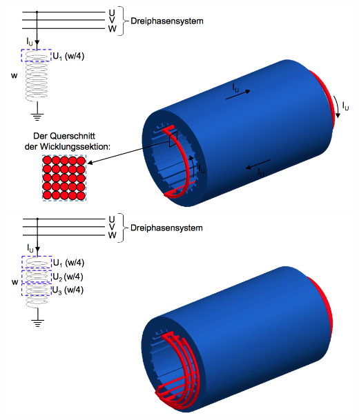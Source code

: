 \begin{minipage}{0.5 \linewidth}
\includegraphics[width = \linewidth]{./Pics/VL89/Drehfeld2}
\includegraphics[width = \linewidth]{./Pics/VL89/Drehfeld4}
\end{minipage}

